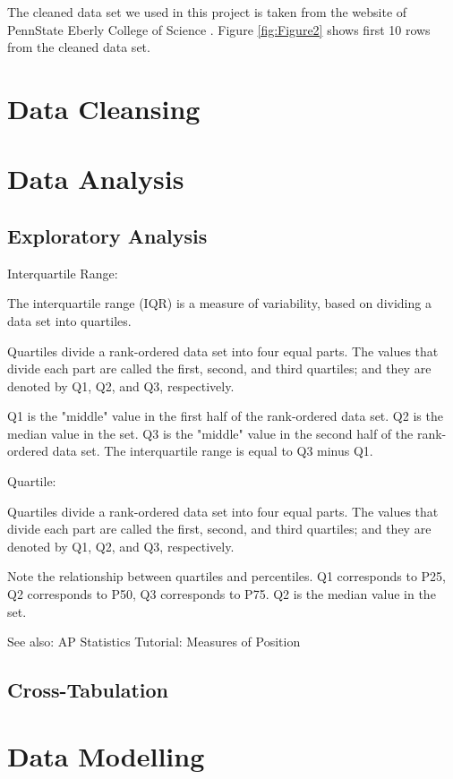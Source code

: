 \documentclass[sigconf]{acmart}
\begin{document}
The cleaned data set we used in this project is taken from the website of PennState Eberly College of Science \cite{psu-site}. Figure \ref{fig:Figure2} shows first 10 rows from the cleaned data set. 

\section{Data Cleansing}



\section{Data Analysis}

\subsection{Exploratory Analysis}

Interquartile Range:

The interquartile range (IQR) is a measure of variability, based on dividing a data set into quartiles.

Quartiles divide a rank-ordered data set into four equal parts. The values that divide each part are called the first, second, and third quartiles; and they are denoted by Q1, Q2, and Q3, respectively.

Q1 is the "middle" value in the first half of the rank-ordered data set.
Q2 is the median value in the set.
Q3 is the "middle" value in the second half of the rank-ordered data set.
The interquartile range is equal to Q3 minus Q1.\cite{stat-trek-statistics}

Quartile:

Quartiles divide a rank-ordered data set into four equal parts. The values that divide each part are called the first, second, and third quartiles; and they are denoted by Q1, Q2, and Q3, respectively.

Note the relationship between quartiles and percentiles. Q1 corresponds to P25, Q2 corresponds to P50, Q3 corresponds to P75. Q2 is the median value in the set.

See also:  	AP Statistics Tutorial: Measures of Position



\subsection{Cross-Tabulation}

\section{Data Modelling}
\end{document}

